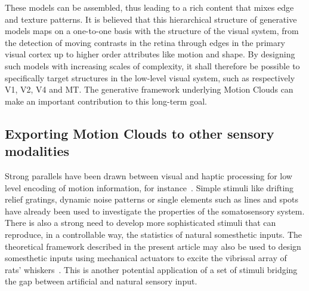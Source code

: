 \documentclass[a4paper,11pt]{article}%
\begin{document}
These models can be assembled, thus leading to a rich content that mixes edge and texture patterns. It is believed that this hierarchical structure of generative models maps on a one-to-one basis with the structure of the visual system, from the detection of moving contrasts in the retina through edges in the primary visual cortex up to higher order attributes like motion and shape.  By designing such models with increasing scales of complexity, it shall therefore be possible to specifically target structures in the low-level visual system, such as respectively V1, V2, V4 and MT. The generative framework underlying Motion Clouds can make an important contribution to this long-term goal. %
%
\subsection{Exporting Motion Clouds to other sensory modalities}
Strong parallels have been drawn between visual and haptic processing for low level encoding of motion information, for instance~\citep{Pei11}. Simple stimuli like drifting relief gratings, dynamic noise patterns or single elements such as lines and spots have already been used to investigate the properties of the somatosensory system. There is also a strong need to develop more sophisticated stimuli that can reproduce, in a controllable way, the statistics of natural somesthetic inputs.  The theoretical framework described in the present article may also be used to design somesthetic inputs using mechanical actuators to excite the vibrissal array of rats' whiskers~\citep{Jacob08}. This is another potential application of a set of stimuli bridging the gap between artificial and natural sensory input. %
%
 

%
%
%
%
\end{document}
